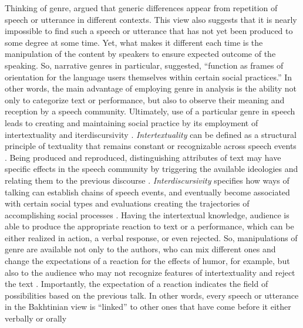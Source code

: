 \documentclass[12pt, draft]{article}
\begin{document}
Thinking of genre, \textcite{bakhtin1986} argued that generic differences appear from repetition of speech or utterance in different contexts. This view also suggests that it is nearly impossible to find such a speech or utterance that has not yet been produced to some degree at some time. Yet, what makes it different each time is the manipulation of the content by speakers to ensure expected outcome of the speaking. So, narrative genres in particular, \textcite[p. 181]{hyvarinen2015} suggested, ``function as frames of orientation for the language users themselves within certain social practices.'' In other words, the main advantage of employing genre in analysis is the ability not only to categorize text or performance, but also to observe their meaning and reception by a speech community. Ultimately, use of a particular genre in speech leads to creating and maintaining social practice by its employment of intertextuality \parencite{briggs1992} and iterdiscursivity \parencite{wortham2015}. \textit{Intertextuality} can be defined as a structural principle of textuality that remains constant or recognizable across speech events \parencite{wortham2015}. Being produced and reproduced, distinguishing attributes of text may have specific effects in the speech community by triggering the available ideologies and relating them to the previous discourse \parencite{bakhtin1986}. \textit{Interdiscursivity} specifies how ways of talking can establish chains of speech events, and eventually become associated with certain social types and evaluations creating the trajectories of accomplishing social processes \parencite{agha2003}. Having the intertextual knowledge, audience is able to produce the appropriate reaction to text or a performance, which can be either realized in action, a verbal response, or even rejected. So, manipulations of genre are available not only to the authors, who can mix different ones and change the expectations of a reaction for the effects of humor, for example, but also to the audience who may not recognize features of intertextuality and reject the text \parencite{bax2011}. Importantly, the expectation of a reaction indicates the field of possibilities based on the previous talk. In other words, every speech or utterance in the Bakhtinian view is ``linked'' to other ones that have come before it either verbally or orally \parencite[p. 69]{bakhtin1986}
\end{document}
